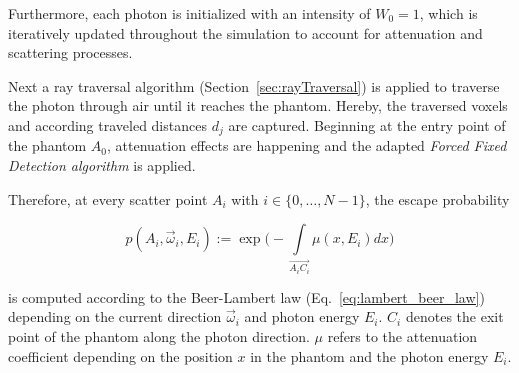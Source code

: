 \begin{figure}[H]
    \centering
\end{figure}

Furthermore, each photon is initialized with an intensity of $W_0=1$, which is
iteratively updated throughout the simulation to account for attenuation and
scattering processes.

Next a ray traversal algorithm (Section~\ref{sec:rayTraversal}) is applied to
traverse the photon through air until it reaches the phantom. Hereby, the
traversed voxels and according traveled distances $d_j$ are captured. Beginning at the
entry point of the phantom $A_0$, attenuation effects are happening and the
adapted \emph{Forced Fixed Detection algorithm} is applied.

Therefore, at every scatter point $A_i$ with $i \in \{0, \ldots, N-1\}$, the escape probability

\begin{equation}
    \label{eq:escapeProbability}
    p(A_i, \vec{\omega}_i, E_i) := \exp\bigg(-\int\limits_{\overrightarrow{A_iC_i}} \mu(x, E_i) dx\bigg)
\end{equation}

is computed according to the Beer-Lambert law (Eq.~\ref{eq:lambert_beer_law})
depending on the current direction $\vec{\omega}_i$ and photon energy $E_i$.
$C_i$ denotes the exit point of the phantom along the photon direction. $\mu$ refers to
the attenuation coefficient depending on the position $x$ in the phantom and the
photon energy $E_i$.

